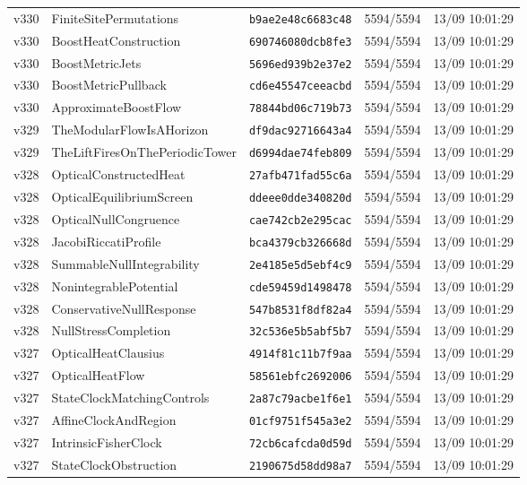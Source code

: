 \documentclass[11pt]{article}
\theoremstyle{definition}\newtheorem{deriv}{Derivação}
\begin{document}
{\begin{longtable}{@{}lllll@{}}
v330 & FiniteSitePermutations & \texttt{b9ae2e48c6683c48} & 5594/5594 & 13/09 10:01:29 \\
v330 & BoostHeatConstruction & \texttt{690746080dcb8fe3} & 5594/5594 & 13/09 10:01:29 \\
v330 & BoostMetricJets & \texttt{5696ed939b2e37e2} & 5594/5594 & 13/09 10:01:29 \\
v330 & BoostMetricPullback & \texttt{cd6e45547ceeacbd} & 5594/5594 & 13/09 10:01:29 \\
v330 & ApproximateBoostFlow & \texttt{78844bd06c719b73} & 5594/5594 & 13/09 10:01:29 \\
v329 & TheModularFlowIsAHorizon & \texttt{df9dac92716643a4} & 5594/5594 & 13/09 10:01:29 \\
v329 & TheLiftFiresOnThePeriodicTower & \texttt{d6994dae74feb809} & 5594/5594 & 13/09 10:01:29 \\
v328 & OpticalConstructedHeat & \texttt{27afb471fad55c6a} & 5594/5594 & 13/09 10:01:29 \\
v328 & OpticalEquilibriumScreen & \texttt{ddeee0dde340820d} & 5594/5594 & 13/09 10:01:29 \\
v328 & OpticalNullCongruence & \texttt{cae742cb2e295cac} & 5594/5594 & 13/09 10:01:29 \\
v328 & JacobiRiccatiProfile & \texttt{bca4379cb326668d} & 5594/5594 & 13/09 10:01:29 \\
v328 & SummableNullIntegrability & \texttt{2e4185e5d5ebf4c9} & 5594/5594 & 13/09 10:01:29 \\
v328 & NonintegrablePotential & \texttt{cde59459d1498478} & 5594/5594 & 13/09 10:01:29 \\
v328 & ConservativeNullResponse & \texttt{547b8531f8df82a4} & 5594/5594 & 13/09 10:01:29 \\
v328 & NullStressCompletion & \texttt{32c536e5b5abf5b7} & 5594/5594 & 13/09 10:01:29 \\
v327 & OpticalHeatClausius & \texttt{4914f81c11b7f9aa} & 5594/5594 & 13/09 10:01:29 \\
v327 & OpticalHeatFlow & \texttt{58561ebfc2692006} & 5594/5594 & 13/09 10:01:29 \\
v327 & StateClockMatchingControls & \texttt{2a87c79acbe1f6e1} & 5594/5594 & 13/09 10:01:29 \\
v327 & AffineClockAndRegion & \texttt{01cf9751f545a3e2} & 5594/5594 & 13/09 10:01:29 \\
v327 & IntrinsicFisherClock & \texttt{72cb6cafcda0d59d} & 5594/5594 & 13/09 10:01:29 \\
v327 & StateClockObstruction & \texttt{2190675d58dd98a7} & 5594/5594 & 13/09 10:01:29 \\

\end{longtable}}
\end{document}
